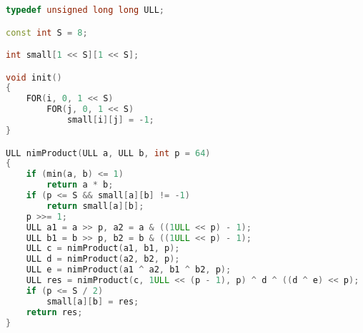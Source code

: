 \begin{lstlisting}[caption={nim-product.hpp}, language=C++]
typedef unsigned long long ULL;

const int S = 8;

int small[1 << S][1 << S];

void init()
{
	FOR(i, 0, 1 << S)
		FOR(j, 0, 1 << S)
			small[i][j] = -1;
}

ULL nimProduct(ULL a, ULL b, int p = 64)
{
	if (min(a, b) <= 1)
		return a * b;
	if (p <= S && small[a][b] != -1)
		return small[a][b];
	p >>= 1;
	ULL a1 = a >> p, a2 = a & ((1ULL << p) - 1);
	ULL b1 = b >> p, b2 = b & ((1ULL << p) - 1);
	ULL c = nimProduct(a1, b1, p);
	ULL d = nimProduct(a2, b2, p);
	ULL e = nimProduct(a1 ^ a2, b1 ^ b2, p);
	ULL res = nimProduct(c, 1ULL << (p - 1), p) ^ d ^ ((d ^ e) << p);
	if (p <= S / 2)
		small[a][b] = res;
	return res;
}
\end{lstlisting}
